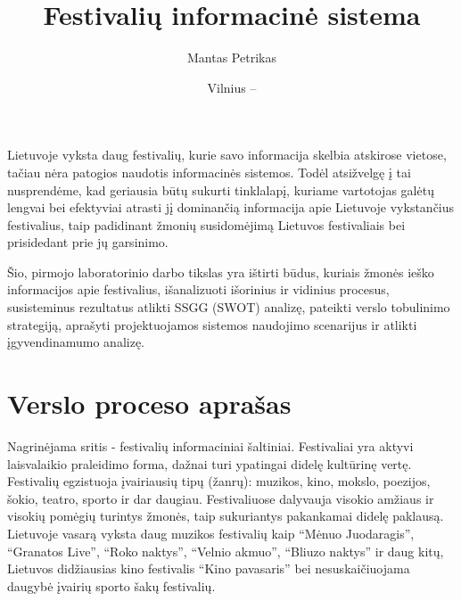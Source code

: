 \documentclass{VUMIFPSkursinis}
\title{Festivalių informacinė sistema}
\author{Mantas Petrikas}
\date{Vilnius – \the\year}
\begin{document}
\maketitle

\tableofcontents


Lietuvoje vyksta daug festivalių, kurie savo informacija skelbia atskirose vietose, tačiau nėra patogios naudotis informacinės sistemos. 
Todėl atsižvelgę į tai nusprendėme, kad geriausia būtų sukurti tinklalapį, kuriame vartotojas galėtų lengvai bei efektyviai atrasti jį dominančią informacija apie Lietuvoje vykstančius festivalius, taip padidinant žmonių susidomėjimą Lietuvos festivaliais bei prisidedant prie jų garsinimo.

Šio, pirmojo laboratorinio darbo tikslas yra ištirti būdus, kuriais žmonės ieško informacijos apie festivalius, išanalizuoti išorinius ir vidinius procesus, susisteminus rezultatus atlikti SSGG (SWOT) analizę, pateikti verslo tobulinimo strategiją, aprašyti projektuojamos sistemos naudojimo scenarijus ir atlikti įgyvendinamumo analizę. 

\section{Verslo proceso aprašas}

Nagrinėjama sritis - festivalių informaciniai šaltiniai. 
Festivaliai yra aktyvi laisvalaikio praleidimo forma, dažnai turi ypatingai didelę kultūrinę vertę. 
Festivalių egzistuoja įvairiausių tipų (žanrų): muzikos, kino, mokslo, poezijos, šokio, teatro, sporto ir dar daugiau. 
Festivaliuose dalyvauja visokio amžiaus ir visokių pomėgių turintys žmonės, taip sukuriantys pakankamai didelę paklausą. 
Lietuvoje vasarą vyksta daug muzikos festivalių kaip “Mėnuo Juodaragis”, “Granatos Live”, “Roko naktys”, “Velnio akmuo”, “Bliuzo naktys” ir daug kitų,
 Lietuvos didžiausias kino festivalis “Kino pavasaris” bei nesuskaičiuojama daugybė įvairių sporto šakų festivalių.
\end{document}
